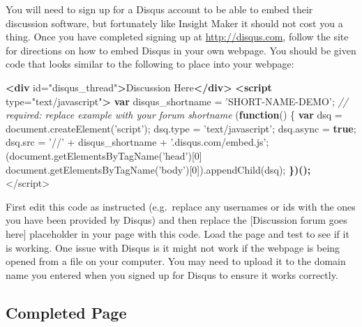\documentclass[]{memoir}
\newenvironment{Shaded}{}{}
\newcommand{\KeywordTok}[1]{\textcolor[rgb]{0.00,0.44,0.13}{\textbf{{#1}}}}
\newcommand{\DecValTok}[1]{\textcolor[rgb]{0.25,0.63,0.44}{{#1}}}
\newcommand{\StringTok}[1]{\textcolor[rgb]{0.25,0.44,0.63}{{#1}}}
\newcommand{\CommentTok}[1]{\textcolor[rgb]{0.38,0.63,0.69}{\textit{{#1}}}}
\newcommand{\OtherTok}[1]{\textcolor[rgb]{0.00,0.44,0.13}{{#1}}}
\newcommand{\FunctionTok}[1]{\textcolor[rgb]{0.02,0.16,0.49}{{#1}}}
\newcommand{\ErrorTok}[1]{\textcolor[rgb]{1.00,0.00,0.00}{\textbf{{#1}}}}
\newcommand{\NormalTok}[1]{{#1}}
\begin{document}
You will need to sign up for a Disqus account to be able to embed their
discussion software, but fortunately like Insight Maker it should not
cost you a thing. Once you have completed signing up at
\url{http://disqus.com}, follow the site for directions on how to embed
Disqus in your own webpage. You should be given code that looks similar
to the following to place into your webpage:

\begin{Shaded}
\begin{Highlighting}[]
\KeywordTok{<div}\OtherTok{ id=}\StringTok{"disqus_thread"}\KeywordTok{>}\NormalTok{Discussion Here}\KeywordTok{</div>}
\KeywordTok{<script}\OtherTok{ type=}\StringTok{"text/javascript"}\KeywordTok{>}
    \KeywordTok{var} \NormalTok{disqus_shortname = }\StringTok{'SHORT-NAME-DEMO'}\NormalTok{; }\CommentTok{// required: replace example with your forum shortname}
    \NormalTok{(}\KeywordTok{function}\NormalTok{() \{}
        \KeywordTok{var} \NormalTok{dsq = }\OtherTok{document}\NormalTok{.}\FunctionTok{createElement}\NormalTok{(}\StringTok{'script'}\NormalTok{); }\OtherTok{dsq}\NormalTok{.}\FunctionTok{type} \NormalTok{= }\StringTok{'text/javascript'}\NormalTok{; }\OtherTok{dsq}\NormalTok{.}\FunctionTok{async} \NormalTok{= }\KeywordTok{true}\NormalTok{;}
        \OtherTok{dsq}\NormalTok{.}\FunctionTok{src} \NormalTok{= }\StringTok{'//'} \NormalTok{+ disqus_shortname + }\StringTok{'.disqus.com/embed.js'}\NormalTok{;}
        \NormalTok{(}\OtherTok{document}\NormalTok{.}\FunctionTok{getElementsByTagName}\NormalTok{(}\StringTok{'head'}\NormalTok{)[}\DecValTok{0}\NormalTok{] \textbar{}\textbar{} }\OtherTok{document}\NormalTok{.}\FunctionTok{getElementsByTagName}\NormalTok{(}\StringTok{'body'}\NormalTok{)[}\DecValTok{0}\NormalTok{]).}\FunctionTok{appendChild}\NormalTok{(dsq);}
\ErrorTok{    \})();}
\NormalTok{<}\OtherTok{/script>   }
\end{Highlighting}
\end{Shaded}

First edit this code as instructed (e.g.~replace any usernames or ids
with the ones you have been provided by Disqus) and then replace the
{[}Discussion forum goes here{]} placeholder in your page with this
code. Load the page and test to see if it is working. One issue with
Disqus is it might not work if the webpage is being opened from a file
on your computer. You may need to upload it to the domain name you
entered when you signed up for Disqus to ensure it works correctly.

\subsection{Completed Page}
\end{document}
